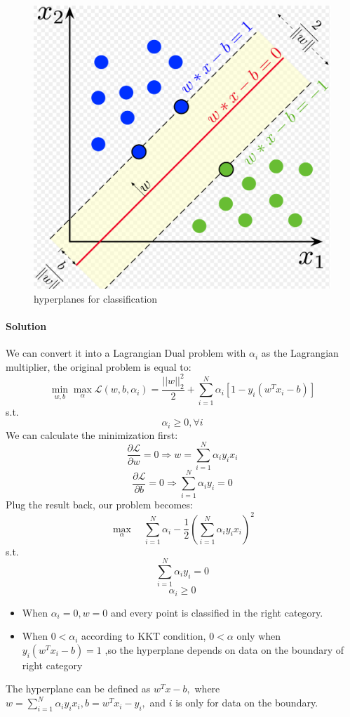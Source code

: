 \documentclass{article}
\begin{document}
    \begin{figure}[H]
        \centering
        \includegraphics[scale=0.25]{P1.jpg}
        \caption{hyperplanes for classification}
    \end{figure}
\paragraph{Solution}
We can convert it into a Lagrangian Dual problem with $\alpha_i$ as the Lagrangian multiplier, the original problem is equal to: 
$$\min_{w,b}\max_\alpha\mathcal{L}(w,b,\alpha_i)=\frac{||w||^2_2}{2}+\sum_{i=1}^N\alpha_i[1-y_i(w^Tx_i-b)]$$
s.t.
$$\alpha_i\geq0,\forall i$$
We can calculate the minimization first:
$$\frac{\partial\mathcal{L}}{\partial w}=0\Rightarrow w=\sum_{i=1}^N\alpha_iy_ix_i$$
$$\frac{\partial\mathcal{L}}{\partial b}=0\Rightarrow \sum_{i=1}^N\alpha_iy_i=0$$
Plug the result back, our problem becomes: 
    $$\max_\alpha\quad\sum_{i=1}^N\alpha_i-\frac{1}{2}(\sum_{i=1}^N\alpha_iy_ix_i)^2$$
s.t.
    $$\sum_{i=1}^N\alpha_iy_i=0$$
    $$\alpha_i\geq0$$
\begin{itemize}
    \item When $\alpha_i=0,w=0$ and every point is classified in the right category.
    \item When $0<\alpha_i$ according to KKT condition, $0<\alpha$ only when $y_i(w^Tx_i-b)=1$ ,so the hyperplane depends on data on the boundary of right category
\end{itemize}
The hyperplane can be defined as $w^Tx-b,$ where $w=\sum_{i=1}^N\alpha_iy_ix_i,b=w^Tx_i-y_i,$ and $i$ is only for data on the boundary.
\end{document}
